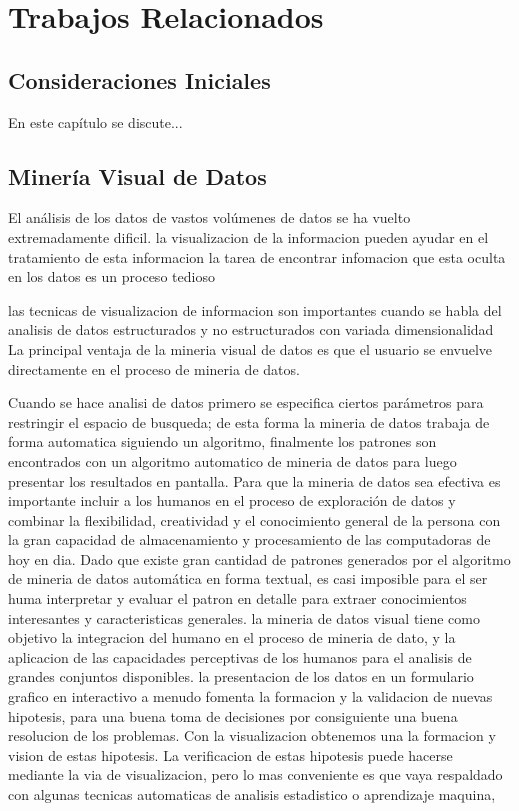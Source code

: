 \chapter{Trabajos Relacionados}
\section{Consideraciones Iniciales}
En este capítulo se discute... 
\section{Minería Visual de Datos}
El análisis de los datos de vastos volúmenes de datos se ha vuelto extremadamente dificil. la visualizacion de la informacion pueden ayudar en el tratamiento de esta informacion 
la tarea de encontrar infomacion que esta oculta en los datos es un proceso tedioso

las tecnicas de visualizacion de informacion son importantes cuando se habla del analisis de datos estructurados y no estructurados con variada dimensionalidad
La principal ventaja de la mineria visual de datos es que el usuario se envuelve directamente en el proceso de mineria de datos.

Cuando se hace analisi de datos primero se especifica ciertos parámetros para restringir el espacio de busqueda; de esta forma la mineria de datos trabaja de forma automatica siguiendo un algoritmo, finalmente los patrones son encontrados con un algoritmo automatico de mineria de datos para luego presentar los resultados en pantalla. Para que la mineria de datos sea efectiva   es importante incluir a los humanos en el proceso de exploración de datos y combinar la flexibilidad, creatividad y el conocimiento general de la persona con la gran capacidad de almacenamiento y procesamiento de las computadoras de hoy en dia. Dado que existe gran cantidad de patrones generados por el algoritmo de mineria de datos automática en forma textual, es casi imposible para el ser huma interpretar y evaluar el patron en detalle para extraer conocimientos interesantes y caracteristicas generales. la mineria de datos visual tiene como objetivo la integracion del humano en el proceso de mineria de dato, y la aplicacion de las capacidades perceptivas de los humanos para el analisis de grandes conjuntos disponibles. la presentacion de los datos en un formulario grafico en interactivo a menudo fomenta la formacion y la validacion de nuevas hipotesis, para una buena toma de decisiones por consiguiente una buena resolucion de los problemas. Con la visualizacion obtenemos una la formacion y vision de estas hipotesis. La verificacion de estas hipotesis puede hacerse mediante la via de visualizacion, pero lo mas conveniente es que vaya respaldado con algunas tecnicas automaticas de analisis estadistico o aprendizaje maquina, 

